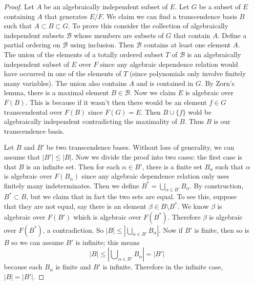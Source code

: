 \begin{proof}
Let $A$ be an algebraically independent subset of $E$. Let $G$ be a subset
of $E$ containing $A$ that generates $E/F$. We claim we can find a
transcendence basis $B$ such that $A \subset B \subset G$.
To prove this consider the collection of algebraically independent subsets
$\mathcal{B}$ whose members are subsets of $G$ that contain $A$.
Define a partial ordering on $\mathcal{B}$ using inclusion.
Then $\mathcal{B}$ contains at least one element $A$.
The union of the elements of a totally ordered subset $T$ of $\mathcal{B}$
is an algebraically independent subset of $E$ over $F$ since any algebraic
dependence relation would have occurred in one of the elements of $T$
(since polynomials only involve finitely many variables). The union also
contains $A$ and is contained in $G$. By Zorn's lemma, there is a maximal
element $B \in \mathcal{B}$. Now we claim $E$ is algebraic over $F(B)$.
This is because if it wasn't then there would be an element
$f \in G$ transcendental over $F(B)$ since $F(G) = E$. Then
$B \cup\{f\}$ wold be algebraically independent contradicting the
maximality of $B$. Thus $B$ is our transcendence basis.

\medskip\noindent
Let $B$ and $B'$ be two transcendence bases. Without loss of generality, we
can assume that $|B'| \leq |B|$. Now we divide the proof into two cases: the
first case is that $B$ is an infinite set. Then for each $\alpha \in B'$,
there is a finite set $B_{\alpha}$ such that $\alpha$ is algebraic over
$F(B_{\alpha})$ since any algebraic dependence relation only uses finitely many
indeterminates. Then we define $B^* = \bigcup_{\alpha\in B'} B_{\alpha}$.
By construction, $B^* \subset B$, but we claim that in fact the two sets are
equal. To see this, suppose that they are not equal, say there is an element
$\beta \in B \setminus B^*$. We know $\beta$ is algebraic over $F(B')$ which
is algebraic over $F(B^*)$. Therefore $\beta$ is algebraic over $F(B^*)$, a
contradiction. So $|B| \leq |\bigcup_{\alpha \in B'} B_{\alpha}|$.
Now if $B'$ is finite, then so is $B$ so we can assume $B'$ is infinite;
this means
$$
|B| \leq |\bigcup\nolimits_{\alpha \in B'} B_{\alpha}| = |B'|
$$
because each $B_\alpha$ is finite and $B'$ is infinite. Therefore in the
infinite case, $|B| = |B'|$.


\end{proof}
